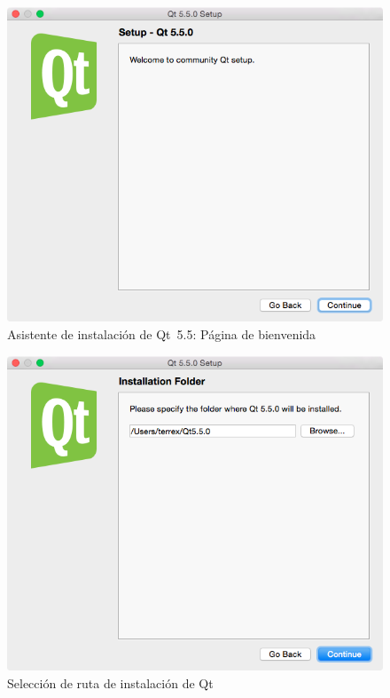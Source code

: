 \begin{figure}[htbp]
\centering
\includegraphics[width=11.5cm]{qt-1}
\caption{Asistente de instalación de Qt~5.5: Página de bienvenida}
\label{fig:qt-1}
\end{figure}

\begin{figure}[htbp]
\centering
\includegraphics[width=11.5cm]{qt-2}
\caption{Selección de ruta de instalación de Qt}
\label{fig:qt-2}
\end{figure}

